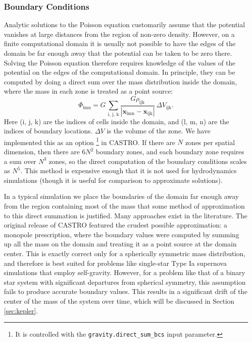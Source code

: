 \documentclass[12pt,preprint]{aastex}
\begin{document}
\subsubsection{Boundary Conditions}\label{sec:gravity_boundary_conditions}

Analytic solutions to the Poisson equation customarily assume that the potential vanishes at large distances from the region of non-zero density. However, on a finite computational domain it is usually not possible to have the edges of the domain be far enough away that the potential can be taken to be zero there. Solving the Poisson equation therefore requires knowledge of the values of the potential on the edges of the computational domain. In principle, they can be computed by doing a direct sum over the mass distribution inside the domain, where the mass in each zone is treated as a point source:
\begin{equation}
  \Phi_{\text{lmn}} = G\, \sum_{\text{i, j, k}} \frac{G \rho_{\text{ijk}}}{|\mathbf{x}_{\text{lmn}} - \mathbf{x}_{\text{ijk}}|}\, \Delta V_{\text{ijk}}.\label{direct_sum}
\end{equation}
Here (i, j, k) are the indices of cells inside the domain, and (l, m, n) are the indices of boundary locations. $\Delta V$ is the volume of the zone. We have implemented this as an option \footnote{It is controlled with the \texttt{gravity.direct\_sum\_bcs} input parameter.} in CASTRO. If there are $N$ zones per spatial dimension, then there are $6 N^2$ boundary zones, and each boundary zone requires a sum over $N^3$ zones, so the direct computation of the boundary conditions scales as $N^5$.  This method is expensive enough that it is not used for hydrodynamics simulations (though it is useful for comparison to approximate solutions).

In a typical simulation we place the boundaries of the domain far enough away from the region containing most of the mass that some method of approximation to this direct summation is justified. Many approaches exist in the literature. The original release of CASTRO featured the crudest possible approximation: a monopole prescription, where the boundary values were computed by summing up all the mass on the domain and treating it as a point source at the domain center. This is exactly correct only for a spherically symmetric mass distribution, and therefore is best suited for problems like single-star Type Ia supernova simulations that employ self-gravity. However, for a problem like that of a binary star system with significant departures from spherical symmetry, this assumption fails to produce accurate boundary values. This results in a significant drift of the center of the mass of the system over time, which will be discussed in Section \ref{sec:kepler}.
\end{document}
